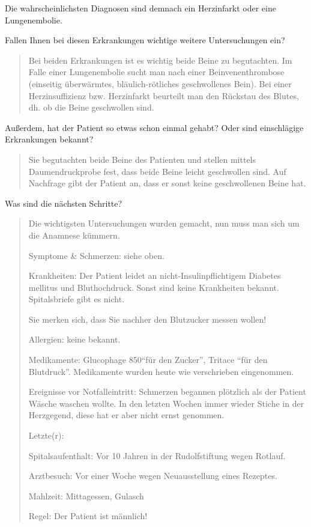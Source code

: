 \documentclass[
ngerman,
paper=a4,
asymmetric,
fontsize=10pt,
headings=small,
draft=false,
numbers=noenddot,
bibtotocnumbered,
footnotes=multiple,
]{scrreprt}
\begin{document}
Die wahrscheinlichsten Diagnosen sind demnach ein
Herzinfarkt oder eine Lungenembolie.

\noindent Fallen Ihnen bei diesen Erkrankungen wichtige
weitere Untersuchungen ein?

\begin{quote}
  Bei beiden Erkrankungen ist es
  wichtig beide Beine zu begutachten. Im Falle einer Lungenembolie sucht man nach
  einer Beinvenenthrombose (einseitig überwärmtes, bläulich-rötliches geschwollenes
  Bein). Bei einer Herzinsuffizienz bzw. Herzinfarkt beurteilt man den Rückstau des
  Blutes, dh. ob die Beine geschwollen sind.
\end{quote}


\noindent Außerdem, hat der Patient so etwas schon einmal
gehabt? Oder sind einschlägige Erkrankungen bekannt?  

\begin{quote}
  Sie begutachten beide Beine des Patienten und stellen mittels
  Daumendruckprobe fest, dass beide Beine leicht geschwollen sind. Auf
  Nachfrage gibt der Patient an, dass er sonst keine geschwollenen Beine
  hat.
\end{quote}

\noindent Was sind die nächsten Schritte?

\begin{quote}
  Die wichtigsten Untersuchungen wurden gemacht, nun muss man sich um die
  Anamnese kümmern.
  
  Symptome \& Schmerzen: siehe oben.
  
  Krankheiten: Der Patient leidet an nicht-Insulinpflichtigem Diabetes
  mellitus und Bluthochdruck. Sonst sind keine Krankheiten bekannt.
  Spitalsbriefe gibt es nicht.
  
  Sie merken sich, dass Sie nachher den Blutzucker messen wollen!
  
  Allergien: keine bekannt.
  
  Medikamente: Glucophage 850\Mg* \enquote{für den Zucker},
  Tritace \enquote{für den Blutdruck}. Medikamente wurden heute wie verschrieben eingenommen.
  
  Ereignisse vor Notfalleintritt: Schmerzen begannen plötzlich als der
  Patient Wäsche waschen wollte. In den letzten Wochen immer wieder
  Stiche in der Herzgegend, diese hat er aber nicht ernst genommen.
  
  Letzte(r):
  
  Spitalsaufenthalt: Vor 10 Jahren in der Rudolfstiftung wegen Rotlauf.
  
  Arztbesuch: Vor einer Woche wegen Neuausstellung eines Rezeptes.
  
  Mahlzeit: Mittagessen, Gulasch
  
  Regel: Der Patient ist männlich!
\end{quote}
% 
\end{document}
